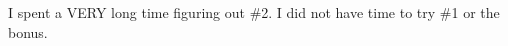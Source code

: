 
I spent a VERY long time figuring out \#2. I did not have time to try \#1 or the bonus.
\section{}
